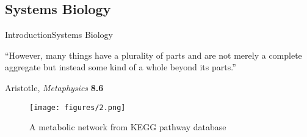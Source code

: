 \documentclass[10pt]{beamer}
\theoremstyle{remark}
\theoremstyle{definition}
\begin{document}
\subsection{Systems Biology}
\begin{frame}{Introduction}{Systems Biology}

\quad ``However, many things have a plurality of parts and are not merely a 
complete aggregate but instead some kind of a whole beyond its parts.'' 
\begin{flushright}
Aristotle, \emph{Metaphysics} \textbf{8.6}
\end{flushright}
    
    \begin{figure}[ht]
    \centering
    \texttt{[image: figures/2.png]}
    \caption{A metabolic network from KEGG pathway database}
	\end{figure}
	
\end{frame}

\end{document}

